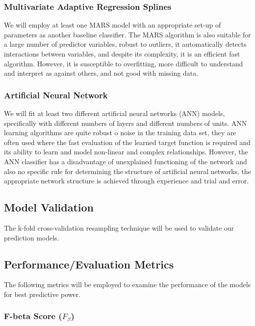 \documentclass[
  10pt,
]{article}
\begin{document}
\subsubsection{Multivariate Adaptive Regression Splines}

We will employ at least one MARS model with an appropriate set-up of parameters as another baseline classifier. The MARS algorithm is also suitable for a large number of predictor variables, robust to outliers, it automatically detects interactions between variables, and despite its complexity, it is an efficient fast algorithm. However, it is susceptible to overfitting, more difficult to understand and interpret as against others, and not good with missing data.

\subsubsection{Artificial Neural Network}

We will fit at least two different artificial neural networks (ANN) models, specifically with different numbers of layers and different numbers of units. ANN learning algorithms are quite robust o noise in the training data set, they are often used where the fast evaluation of the learned target function is required and its ability to learn and model non-linear and complex relationships. However, the ANN classifier has a disadvantage of unexplained functioning of the network and also no specific rule for determining the structure of artificial neural networks, the appropriate network structure is achieved through experience and trial and error.

\subsection{Model Validation}

The k-fold cross-validation resampling technique will be used to validate our prediction models.

\subsection{Performance/Evaluation Metrics}

The following metrics will be employed to examine the performance of the models for best predictive power.

\subsubsection{F-beta Score ($F_\beta$)}
\end{document}
